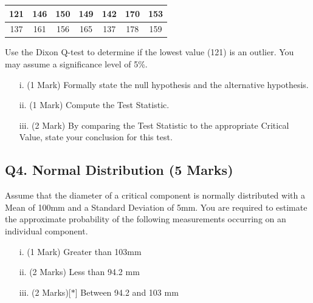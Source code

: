 \documentclass[a4paper,12pt]{article}
\begin{document}
\begin{center}
	\begin{tabular}{|c|c|c|c|c|c|c|}
		\hline
		121 & 146 & 150 &149 &142 &170& 153\\ \hline
		137 & 161 & 156& 165& 137& 178& 159
		\\ \hline
	\end{tabular}
\end{center}
Use the Dixon Q-test to determine if the lowest value (121) is an outlier. You may assume a significance level of 5\%.

\begin{itemize}
	\item[i.] (1 Mark) Formally state the null hypothesis and the alternative hypothesis.
	\item[ii.] (1 Mark) Compute the Test Statistic.
	\item[iii.] (2 Mark) By comparing the Test Statistic to the appropriate Critical Value, state your conclusion for this test.
\end{itemize}
\newpage
\subsection*{Q4. Normal Distribution (5 Marks)} %
Assume that the diameter of a critical component is normally distributed with a Mean of 100mm and a Standard Deviation of 5mm. You are required  to estimate the approximate probability of the following measurements occurring on an individual component.
\begin{itemize}
	\item [i.](1 Mark)	Greater than 103mm
	\item [ii.](2 Marks) Less than 94.2 mm
	\item [iii.](2 Marks)[$\ast$] Between 94.2 and 103 mm
\end{itemize}
\bigskip
\end{document}
